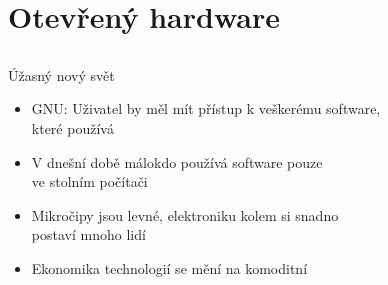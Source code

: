\documentclass{beamer}
\begin{document}
\section{Otevřený hardware}

\subsection{}
\begin{frame}{Úžasný nový svět}
\begin{itemize}
\item GNU: Uživatel by měl mít přístup k veškerému software, \\ které používá
\item V dnešní době málokdo používá software pouze \\ ve stolním počítači
\item Mikročipy jsou levné, elektroniku kolem si snadno \\ postaví mnoho lidí
\item Ekonomika technologií se mění na komoditní
\end{itemize}
\end{frame}
\end{document}
